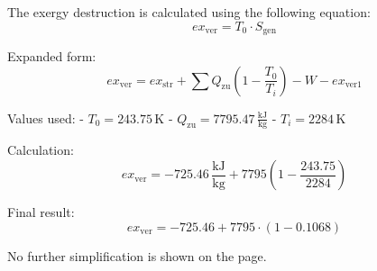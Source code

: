 The exergy destruction is calculated using the following equation:  
\[
ex_{\text{ver}} = T_0 \cdot S_{\text{gen}}
\]  

Expanded form:  
\[
ex_{\text{ver}} = ex_{\text{str}} + \sum Q_{\text{zu}} \left( 1 - \frac{T_0}{T_i} \right) - W - ex_{\text{ver1}}
\]  

Values used:  
- \( T_0 = 243.75 \, \text{K} \)  
- \( Q_{\text{zu}} = 7795.47 \, \frac{\text{kJ}}{\text{kg}} \)  
- \( T_i = 2284 \, \text{K} \)  

Calculation:  
\[
ex_{\text{ver}} = -725.46 \, \frac{\text{kJ}}{\text{kg}} + 7795 \left( 1 - \frac{243.75}{2284} \right)
\]  

Final result:  
\[
ex_{\text{ver}} = -725.46 + 7795 \cdot \left( 1 - 0.1068 \right)
\]  

No further simplification is shown on the page.